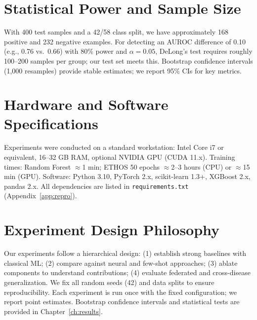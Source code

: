 \section{Statistical Power and Sample Size}

With 400 test samples and a 42/58 class split, we have approximately 168 positive and 232 negative examples. For detecting an AUROC difference of 0.10 (e.g., 0.76 vs.\ 0.66) with 80\% power and $\alpha = 0.05$, DeLong's test requires roughly 100--200 samples per group; our test set meets this. Bootstrap confidence intervals (1,000 resamples) provide stable estimates; we report 95\% CIs for key metrics.

\section{Hardware and Software Specifications}

Experiments were conducted on a standard workstation: Intel Core i7 or equivalent, 16--32 GB RAM, optional NVIDIA GPU (CUDA 11.x). Training times: Random Forest $\approx$1 min; ETHOS 50 epochs $\approx$2--3 hours (CPU) or $\approx$15 min (GPU). Software: Python 3.10, PyTorch 2.x, scikit-learn 1.3+, XGBoost 2.x, pandas 2.x. All dependencies are listed in \texttt{requirements.txt} (Appendix~\ref{app:repro}).

\section{Experiment Design Philosophy}

Our experiments follow a hierarchical design: (1) establish strong baselines with classical ML; (2) compare against neural and few-shot approaches; (3) ablate components to understand contributions; (4) evaluate federated and cross-disease generalization. We fix all random seeds (42) and data splits to ensure reproducibility. Each experiment is run once with the fixed configuration; we report point estimates. Bootstrap confidence intervals and statistical tests are provided in Chapter~\ref{ch:results}.

